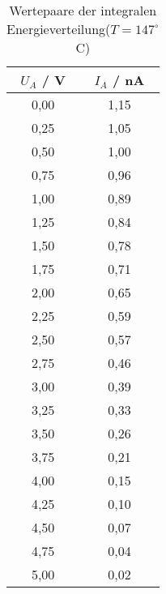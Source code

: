 \begin{table}[h]
	\begin{center}
		\begin{tabular}{cc}
			$U_A$ / V& $I_A$ / nA\\ \hline
			0,00&	1,15\\
			0,25	&1,05\\
			0,50	&1,00\\
			0,75	&0,96\\
			1,00	&0,89\\
			1,25	&0,84\\
			1,50	&0,78\\
			1,75	&0,71\\
			2,00	&0,65\\
			2,25	&0,59\\
			2,50	&0,57\\
			2,75	&0,46\\
			3,00	&0,39\\
			3,25	&0,33\\
			3,50	&0,26\\
			3,75	&0,21\\
			4,00	&0,15\\
			4,25	&0,10\\
			4,50	&0,07\\
			4,75	&0,04\\
			5,00	&0,02
		\end{tabular}
		\caption{Wertepaare der integralen Energieverteilung($T=147^{\circ}$ C)}
		\label{tab2}
	\end{center}
\end{table}